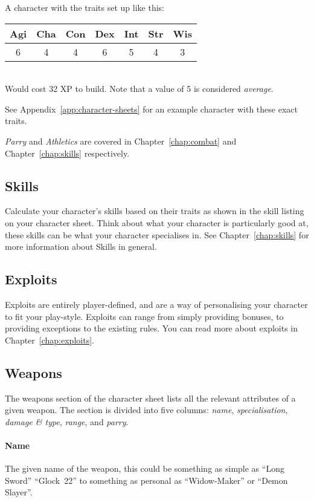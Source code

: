 \begin{example}
A character with the traits set up like this:

\begin{tabular}{ccccccc}
    \textbf{Agi} & \textbf{Cha} & \textbf{Con} & \textbf{Dex} & \textbf{Int} & \textbf{Str} & \textbf{Wis} \\\hline
    6 & 4 & 4 & 6 & 5 & 4 & 3\\ 
\end{tabular}\\
Would cost 32 XP to build.
Note that a value of 5 is considered \textit{average}.

See Appendix~\ref{app:character-sheets} for an example character with these exact traits.
\end{example}

\begin{note} 
    \textit{Parry} and \textit{Athletics} are covered in Chapter~\ref{chap:combat} and Chapter~\ref{chap:skills} respectively.
\end{note}

\subsection{Skills}
Calculate your character's skills based on their traits as shown in the skill listing on your character sheet.
Think about what your character is particularly good at, these skills can be what your character specialises in.
See Chapter~\ref{chap:skills} for more information about Skills in general.

\subsection{Exploits}
Exploits are entirely player-defined, and are a way of personalising your character to fit your play-style.
Exploits can range from simply providing bonuses, to providing exceptions to the existing rules.
You can read more about exploits in Chapter~\ref{chap:exploits}.

\subsection{Weapons}
The weapons section of the character sheet lists all the relevant attributes of a given weapon.
The section is divided into five columns: \textit{name}, \textit{specialisation}, \textit{damage \& type}, \textit{range}, and \textit{parry}.

\paragraph{Name} The given name of the weapon, this could be something as simple as ``Long Sword'' ``Glock~22'' to something as personal as ``Widow-Maker'' or ``Demon Slayer''.

